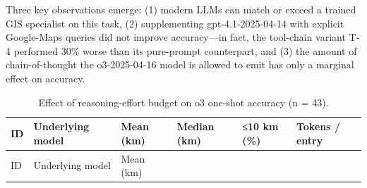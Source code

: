 Three key observations emerge: (1) modern LLMs can match or exceed a
trained GIS specialist on this task, (2) supplementing
gpt-4.1-2025-04-14 with explicit Google-Maps queries did not improve
accuracy---in fact, the tool-chain variant T-4 performed 30\% worse than
its pure-prompt counterpart, and (3) the amount of chain-of-thought the
o3-2025-04-16 model is allowed to emit has only a marginal effect on
accuracy.

\begin{longtable}[]{@{}
  >{\raggedright\arraybackslash}p{}
  >{\raggedright\arraybackslash}p{}
  >{\raggedright\arraybackslash}p{}
  >{\raggedright\arraybackslash}p{}
  >{\raggedright\arraybackslash}p{}
  >{\raggedright\arraybackslash}p{}@{}}
\caption{\label{tbl:reasoning}Effect of reasoning-effort budget on o3
one-shot accuracy (n = 43).}\tabularnewline
\toprule\noalign{}
\begin{minipage}[b]{\linewidth}\raggedright
ID
\end{minipage} & \begin{minipage}[b]{\linewidth}\raggedright
Underlying model
\end{minipage} & \begin{minipage}[b]{\linewidth}\raggedright
Mean (km)
\end{minipage} & \begin{minipage}[b]{\linewidth}\raggedright
Median (km)
\end{minipage} & \begin{minipage}[b]{\linewidth}\raggedright
≤10 km (\%)
\end{minipage} & \begin{minipage}[b]{\linewidth}\raggedright
Tokens / entry
\end{minipage} \\
\midrule\noalign{}
\endfirsthead
\toprule\noalign{}
\begin{minipage}[b]{\linewidth}\raggedright
ID
\end{minipage} & \begin{minipage}[b]{\linewidth}\raggedright
Underlying model
\end{minipage} & \begin{minipage}[b]{\linewidth}\raggedright
Mean (km)
\end{minipage} & \begin{minipage}[b]{\linewidth}\raggedright

\end{minipage}
\end{longtable}

